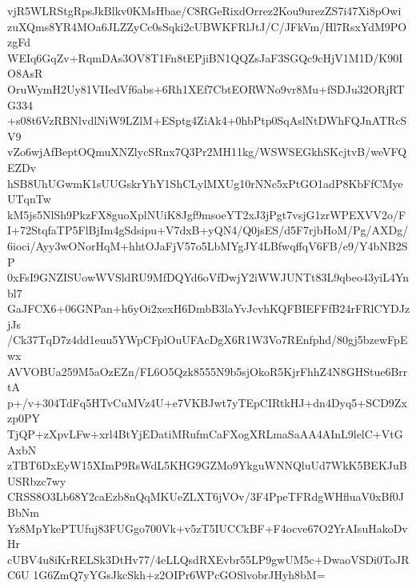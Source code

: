 vjR5WLRStgRpsJkBlkv0KMsHbae/C8RGeRixdOrrez2Kou9urezZS7i47Xi8pOwi
zuXQms8YR4MOa6JLZZyCc0sSqki2cUBWKFRlJtJ/C/JFkVm/Hl7RsxYdM9POzgFd
WEIq6GqZv+RqmDAs3OV8T1Fn8tEPjiBN1QQZsJaF3SGQc9cHjV1M1D/K90IO8AsR
OruWymH2Uy81VIIedVf6abs+6Rh1XEf7CbtEORWNo9vr8Mu+fSDJu32ORjRTG334
+s08t6VzRBNlvdlNiW9LZlM+ESptg4ZiAk4+0hbPtp0SqAslNtDWhFQJnATRcSV9
vZo6wjAfBeptOQmuXNZlycSRnx7Q3Pr2MH11kg/WSWSEGkhSKcjtvB/weVFQEZDv
hSB8UhUGwmK1sUUGskrYhY1ShCLylMXUg10rNNc5xPtGO1adP8KbFfCMyeUTqnTw
kM5js5NlSh9PkzFX8guoXplNUiK8Jgf9msoeYT2xJ3jPgt7vsjG1zrWPEXVV2o/F
I+72StqfaTP5FlBjIm4gSdsipu+V7dxB+yQN4/Q0jsES/d5F7rjbHoM/Pg/AXDg/
6ioci/Ayy3wONorHqM+hhtOJaFjV57o5LbMYgJY4LBfwqffqV6FB/e9/Y4bNB2SP
0xFsI9GNZISUowWVSldRU9MfDQYd6oVfDwjY2iWWJUNTt83L9qbeo43yiL4Ynbl7
GaJFCX6+06GNPan+h6yOi2xexH6DmbB3laYvJcvhKQFBIEFFfB24rFRlCYDJzjJs
/Ck37TqD7z4dd1euu5YWpCFplOuUFAcDgX6R1W3Vo7REnfphd/80gj5bzewFpEwx
AVVOBUa259M5aOzEZn/FL6O5Qzk8555N9b5sjOkoR5KjrFhhZ4N8GHStue6BrrtA
p+/v+304TdFq5HTvCuMVz4U+e7VKBJwt7yTEpCIRtkHJ+dn4Dyq5+SCD9Zxzp0PY
TjQP+zXpvLFw+xrl4BtYjEDatiMRufmCaFXogXRLmaSaAA4AInL9lelC+VtGAxbN
zTBT6DxEyW15XImP9RsWdL5KHG9GZMo9YkguWNNQluUd7WkK5BEKJuBUSRbzc7wy
CRSS8O3Lb68Y2caEzb8nQqMKUeZLXT6jVOv/3F4PpeTFRdgWHfluaV0xBf0JBbNm
Yz8MpYkePTUfuj83FUGgo700Vk+v5zT5IUCCkBF+F4ocve67O2YrAIsuHakoDvHr
cUBV4u8iKrRELSk3DtHv77/4eLLQsdRXEvbr55LP9gwUM5c+DwaoVSDi0ToJRC6U
1G6ZmQ7yYGsJkcSkh+z2OIPr6WPcGOSlvobrJHyh8bM=
